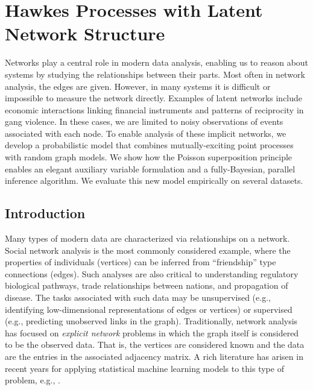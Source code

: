 
\chapter{Hawkes Processes with Latent Network Structure}
Networks play a central role in modern data analysis, enabling us to reason about systems by studying the relationships between their parts.  Most often in network analysis, the edges are given.  However, in many systems it is difficult or impossible to measure the network directly.  Examples of latent networks include economic interactions linking financial instruments and patterns of reciprocity in gang violence.  In these cases, we are limited to noisy observations of events associated with each node.  To enable analysis of these implicit networks, we develop a probabilistic model that combines mutually-exciting point processes with random graph models.  We show how the Poisson superposition principle enables an elegant auxiliary variable formulation and a fully-Bayesian, parallel inference algorithm.  We evaluate this new model empirically on several datasets.

\section{Introduction}
Many types of modern data are characterized via relationships on a network.  Social network analysis is the most commonly considered example, where the properties of individuals (vertices) can be inferred from ``friendship'' type connections (edges).  Such analyses are also critical to understanding regulatory biological pathways, trade relationships between nations, and propagation of disease.  The tasks associated with such data may be unsupervised (e.g., identifying low-dimensional representations of edges or vertices) or supervised (e.g., predicting unobserved links in the graph).  Traditionally, network analysis has focused on \emph{explicit network} problems in which the graph itself is considered to be the observed data.  That is, the vertices are considered known and the data are the entries in the associated adjacency matrix. A rich literature has arisen in recent years for applying statistical machine learning models to this type of problem, e.g., \citet{Liben-2007,Hoff-2008,Goldenberg-2010}.

